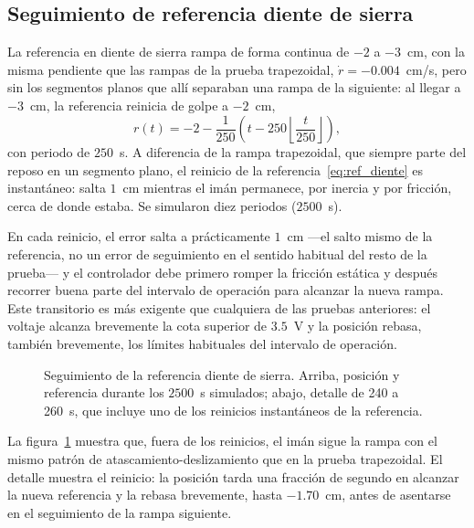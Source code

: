 \FloatBarrier

\subsection{Seguimiento de referencia diente de sierra}

La referencia en diente de sierra rampa de forma continua de $-2$ a $-3$~cm, con la misma pendiente que las rampas de la prueba trapezoidal, $\dot r=-0.004$~cm/s, pero sin los segmentos planos que allí separaban una rampa de la siguiente: al llegar a $-3$~cm, la referencia reinicia de golpe a $-2$~cm,
\begin{equation}
r(t) = -2 - \frac{1}{250}\left(t - 250\left\lfloor \frac{t}{250}\right\rfloor\right) ,
\label{eq:ref_diente}
\end{equation}
con periodo de $250$~s. A diferencia de la rampa trapezoidal, que siempre parte del reposo en un segmento plano, el reinicio de la referencia~\eqref{eq:ref_diente} es instantáneo: salta $1$~cm mientras el imán permanece, por inercia y por fricción, cerca de donde estaba. Se simularon diez periodos ($2500$~s).

En cada reinicio, el error salta a prácticamente $1$~cm —el salto mismo de la referencia, no un error de seguimiento en el sentido habitual del resto de la prueba— y el controlador debe primero romper la fricción estática y después recorrer buena parte del intervalo de operación para alcanzar la nueva rampa. Este transitorio es más exigente que cualquiera de las pruebas anteriores: el voltaje alcanza brevemente la cota superior de $3.5$~V y la posición rebasa, también brevemente, los límites habituales del intervalo de operación.

\begin{figure}[ht]
    \centering
    
    \caption[Seguimiento diente de sierra: posición]{Seguimiento de la referencia diente de sierra. Arriba, posición y referencia durante los $2500$~s simulados; abajo, detalle de 240 a 260~s, que incluye uno de los reinicios instantáneos de la referencia.}
    \label{fig:diente_pos}
\end{figure}

La figura~\ref{fig:diente_pos} muestra que, fuera de los reinicios, el imán sigue la rampa con el mismo patrón de atascamiento-deslizamiento que en la prueba trapezoidal. El detalle muestra el reinicio: la posición tarda una fracción de segundo en alcanzar la nueva referencia y la rebasa brevemente, hasta $-1.70$~cm, antes de asentarse en el seguimiento de la rampa siguiente.

